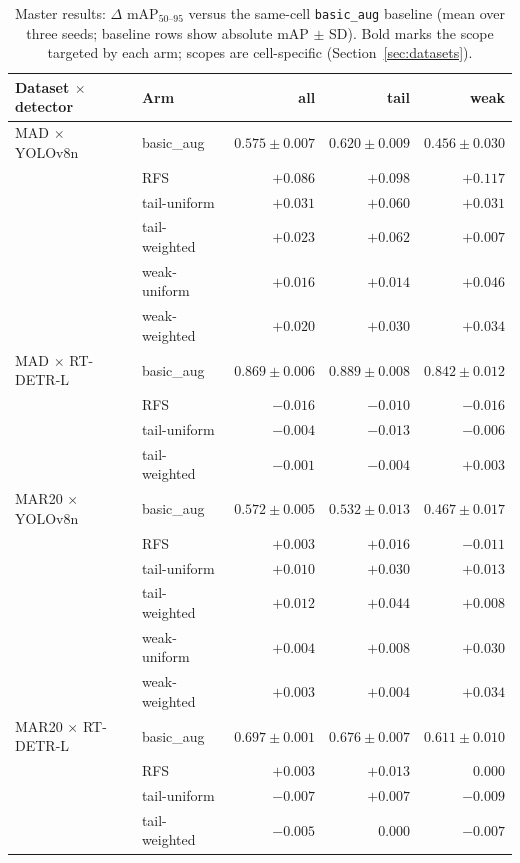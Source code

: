 \documentclass[preprint,12pt,authoryear]{elsarticle}
\newcommand{\mapm}{mAP\(_{50\text{--}95}\)}
\begin{document}
\begin{table}[t]
\centering
\caption{Master results: $\Delta$ \mapm{} versus the same-cell
\texttt{basic\_aug} baseline (mean over three seeds; baseline rows show
absolute mAP $\pm$ SD). Bold marks the scope targeted by each arm;
scopes are cell-specific (Section~\ref{sec:datasets}).}
\label{tab:master}
\small
\begin{tabular}{llrrr}
\toprule
Dataset $\times$ detector & Arm & all & tail & weak \\
\midrule
MAD $\times$ YOLOv8n
  & basic\_aug    & $0.575\pm0.007$ & $0.620\pm0.009$ & $0.456\pm0.030$ \\
  & RFS           & $+0.086$ & $+0.098$ & $+0.117$ \\
  & tail-uniform  & $+0.031$ & $\mathbf{+0.060}$ & $+0.031$ \\
  & tail-weighted & $+0.023$ & $\mathbf{+0.062}$ & $+0.007$ \\
  & weak-uniform  & $+0.016$ & $+0.014$ & $\mathbf{+0.046}$ \\
  & weak-weighted & $+0.020$ & $+0.030$ & $\mathbf{+0.034}$ \\
\midrule
MAD $\times$ RT-DETR-L
  & basic\_aug    & $0.869\pm0.006$ & $0.889\pm0.008$ & $0.842\pm0.012$ \\
  & RFS           & $-0.016$ & $-0.010$ & $-0.016$ \\
  & tail-uniform  & $-0.004$ & $\mathbf{-0.013}$ & $-0.006$ \\
  & tail-weighted & $-0.001$ & $\mathbf{-0.004}$ & $+0.003$ \\
\midrule
MAR20 $\times$ YOLOv8n
  & basic\_aug    & $0.572\pm0.005$ & $0.532\pm0.013$ & $0.467\pm0.017$ \\
  & RFS           & $+0.003$ & $+0.016$ & $-0.011$ \\
  & tail-uniform  & $+0.010$ & $\mathbf{+0.030}$ & $+0.013$ \\
  & tail-weighted & $+0.012$ & $\mathbf{+0.044}$ & $+0.008$ \\
  & weak-uniform  & $+0.004$ & $+0.008$ & $\mathbf{+0.030}$ \\
  & weak-weighted & $+0.003$ & $+0.004$ & $\mathbf{+0.034}$ \\
\midrule
MAR20 $\times$ RT-DETR-L
  & basic\_aug    & $0.697\pm0.001$ & $0.676\pm0.007$ & $0.611\pm0.010$ \\
  & RFS           & $+0.003$ & $+0.013$ & $0.000$ \\
  & tail-uniform  & $-0.007$ & $\mathbf{+0.007}$ & $-0.009$ \\
  & tail-weighted & $-0.005$ & $\mathbf{0.000}$  & $-0.007$ \\
\bottomrule
\end{tabular}
\end{table}
\end{document}
